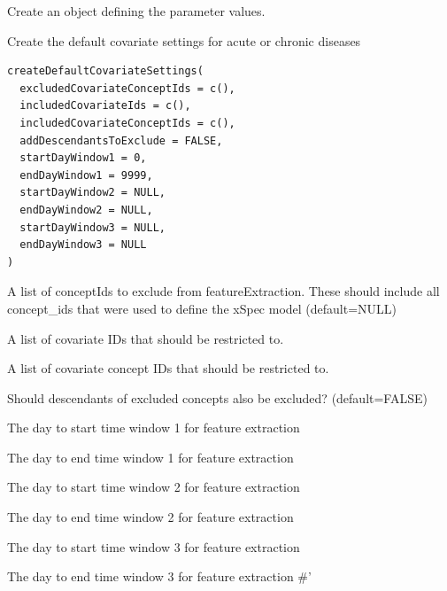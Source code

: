 \documentclass[a4paper]{book}
\begin{document}
%
\begin{Details}
Create an object defining the parameter values.
\end{Details}
%
\begin{Description}
Create the default covariate settings for acute or chronic diseases
\end{Description}
%
\begin{Usage}
\begin{verbatim}
createDefaultCovariateSettings(
  excludedCovariateConceptIds = c(),
  includedCovariateIds = c(),
  includedCovariateConceptIds = c(),
  addDescendantsToExclude = FALSE,
  startDayWindow1 = 0,
  endDayWindow1 = 9999,
  startDayWindow2 = NULL,
  endDayWindow2 = NULL,
  startDayWindow3 = NULL,
  endDayWindow3 = NULL
)
\end{verbatim}
\end{Usage}
%
\begin{Arguments}
\begin{ldescription}
\item[\code{excludedCovariateConceptIds}] A list of conceptIds to exclude from featureExtraction.  These
should include all concept\_ids that were used to define the
xSpec model (default=NULL)

\item[\code{includedCovariateIds}] A list of covariate IDs that should be restricted to.

\item[\code{includedCovariateConceptIds}] A list of covariate concept IDs that should be restricted to.

\item[\code{addDescendantsToExclude}] Should descendants of excluded concepts also be excluded?
(default=FALSE)

\item[\code{startDayWindow1}] The day to start time window 1 for feature extraction

\item[\code{endDayWindow1}] The day to end time window 1 for feature extraction

\item[\code{startDayWindow2}] The day to start time window 2 for feature extraction

\item[\code{endDayWindow2}] The day to end time window 2 for feature extraction

\item[\code{startDayWindow3}] The day to start time window 3 for feature extraction

\item[\code{endDayWindow3}] The day to end time window 3 for feature extraction \#'
\end{ldescription}
\end{Arguments}
\end{document}
